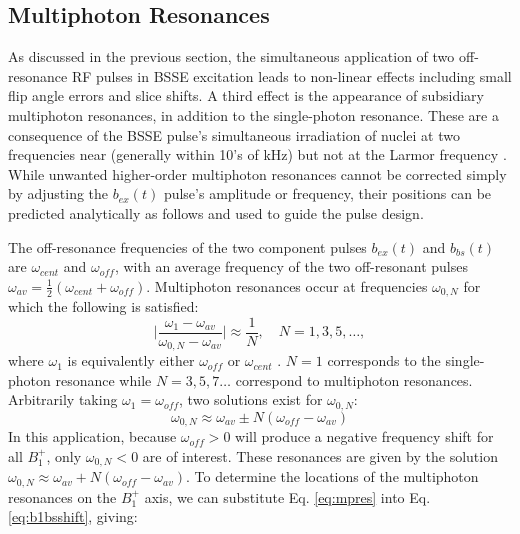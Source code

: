 \documentclass{article}
\newcommand{\bext}{b_{ex}(t)}
\newcommand{\bbst}{b_{bs}(t)}
\begin{document}
\subsection*{Multiphoton Resonances}
As discussed in the previous section, the simultaneous application of two off-resonance RF pulses in BSSE excitation
leads to non-linear effects including small flip angle errors and slice shifts. 
A third effect is the appearance of subsidiary multiphoton resonances,
in addition to the single-photon resonance. These are a consequence of the BSSE pulse's simultaneous irradiation of nuclei at two frequencies near (generally within 10's of kHz) but not at the Larmor frequency \cite{Zur1983MultiphotonI=1/2}.
While unwanted higher-order multiphoton resonances cannot be corrected simply by adjusting the $\bext$ pulse's
amplitude or frequency, 
their positions can be predicted analytically as follows and used to guide the pulse design. \par The off-resonance frequencies of the two component pulses $\bext$ and $\bbst$ are $\omega_{cent}$ and $ \omega_{off}$, with an average frequency of the two off-resonant pulses $\omega_{av}= \frac{1}{2}(\omega_{cent} + \omega_{off})$.
Multiphoton resonances occur at frequencies $\omega_{0,N}$ 
for which the following is satisfied: 
\begin{equation}
    \Big|\frac{\omega_1-\omega_{av}}{\omega_{0,N}-\omega_{av}}\Big| \approx \frac{1}{N}, \quad N = 1, 3, 5, \dots,
\end{equation}
where $\omega_1$ is equivalently either $\omega_{off}$ or $\omega_{cent}$ \cite{Vega1981Multiple-quantumClass}. 
$N=1$ corresponds to the single-photon resonance while $N = 3,5,7\dots$ 
correspond to multiphoton resonances.
Arbitrarily taking $\omega_1 = \omega_{off}$, two solutions exist for $\omega_{0,N}$:
\begin{equation}
    \omega_{0,N} \approx \omega_{av}\pm N(\omega_{off} - \omega_{av}) 
    \label{eq:mpres}
\end{equation}
 In this application, because $\omega_{off} > 0$ will produce a negative frequency shift for all $B_1^+$, only $\omega_{0,N} < 0$ are of interest. These resonances are given by the solution $\omega_{0,N} \approx \omega_{av}+ N(\omega_{off} - \omega_{av})$. 
To determine the locations of the multiphoton resonances on the $B_1^+$ axis,
we can substitute Eq. \ref{eq:mpres} into Eq. \ref{eq:b1bsshift}, giving: 
\end{document}
